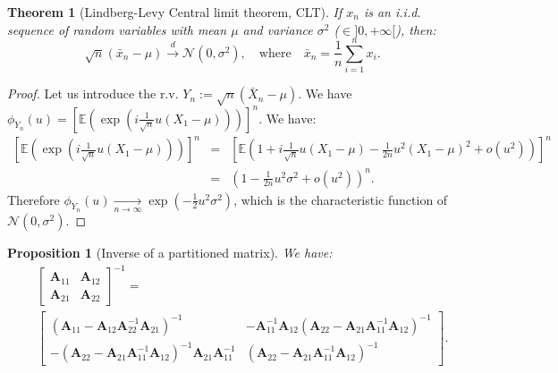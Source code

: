 \documentclass[
]{book}
\newtheorem{theorem}{Theorem}[chapter]
\newtheorem{proposition}{Proposition}[chapter]
\theoremstyle{definition}
\theoremstyle{definition}
\theoremstyle{definition}
\theoremstyle{definition}
\theoremstyle{remark}
\begin{document}
\begin{theorem}[Lindberg-Levy Central limit theorem, CLT]
\protect\hypertarget{thm:LindbergLevyCLT}{}\label{thm:LindbergLevyCLT}If \(x_n\) is an i.i.d. sequence of random variables with mean \(\mu\) and variance \(\sigma^2\) (\(\in ]0,+\infty[\)), then:
\[
\boxed{\sqrt{n} (\bar{x}_n - \mu) \overset{d}{\rightarrow} \mathcal{N}(0,\sigma^2), \quad \mbox{where} \quad \bar{x}_n = \frac{1}{n} \sum_{i=1}^{n} x_i.}
\]
\end{theorem}

\begin{proof}
Let us introduce the r.v. \(Y_n:= \sqrt{n}(\bar{X}_n - \mu)\). We have \(\phi_{Y_n}(u) = \left[ \mathbb{E}\left( \exp(i \frac{1}{\sqrt{n}} u (X_1 - \mu)) \right) \right]^n\). We have:
\begin{eqnarray*}
\left[ \mathbb{E}\left( \exp\left(i \frac{1}{\sqrt{n}} u (X_1 - \mu)\right) \right) \right]^n &=& \left[ \mathbb{E}\left( 1 + i \frac{1}{\sqrt{n}} u (X_1 - \mu) - \frac{1}{2n} u^2 (X_1 - \mu)^2 + o(u^2) \right) \right]^n \\
&=& \left( 1 - \frac{1}{2n}u^2\sigma^2 + o(u^2)\right)^n.
\end{eqnarray*}
Therefore \(\phi_{Y_n}(u) \underset{n \rightarrow \infty}{\rightarrow} \exp \left( - \frac{1}{2}u^2\sigma^2 \right)\), which is the characteristic function of \(\mathcal{N}(0,\sigma^2)\).
\end{proof}

\begin{proposition}[Inverse of a partitioned matrix]
\protect\hypertarget{prp:inversepartitioned}{}\label{prp:inversepartitioned}We have:
\begin{eqnarray*}
&&\left[ \begin{array}{cc} \mathbf{A}_{11} & \mathbf{A}_{12} \\ \mathbf{A}_{21} & \mathbf{A}_{22} \end{array}\right]^{-1} = \\
&&\left[ \begin{array}{cc} (\mathbf{A}_{11} - \mathbf{A}_{12}\mathbf{A}_{22}^{-1}\mathbf{A}_{21})^{-1} & - \mathbf{A}_{11}^{-1}\mathbf{A}_{12}(\mathbf{A}_{22} - \mathbf{A}_{21}\mathbf{A}_{11}^{-1}\mathbf{A}_{12})^{-1} \\
-(\mathbf{A}_{22} - \mathbf{A}_{21}\mathbf{A}_{11}^{-1}\mathbf{A}_{12})^{-1}\mathbf{A}_{21}\mathbf{A}_{11}^{-1} & (\mathbf{A}_{22} - \mathbf{A}_{21}\mathbf{A}_{11}^{-1}\mathbf{A}_{12})^{-1} \end{array} \right].
\end{eqnarray*}
\end{proposition}
\end{document}
